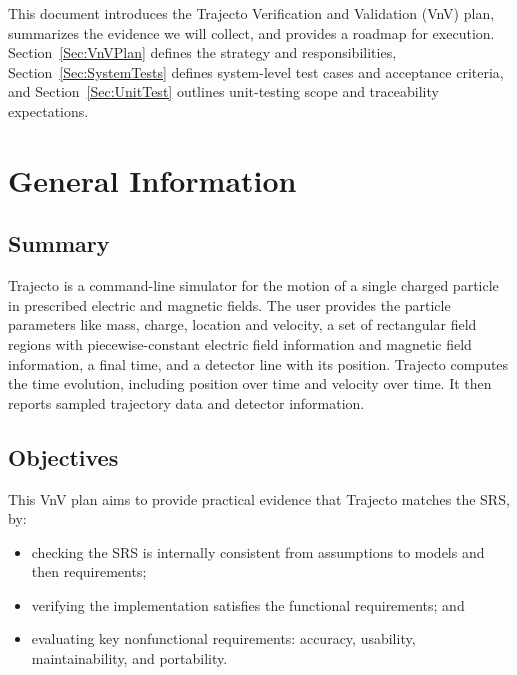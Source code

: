 \documentclass[12pt, titlepage]{article}
\providecommand{\wss}[1]{}
\providecommand{\progname}[1]{#1}
\begin{document}
\wss{symbols, abbreviations, or acronyms --- you can simply reference the SRS
  \citep{SRS} tables, if appropriate}

\wss{Remove this section if it isn't needed}

\newpage


This document introduces the Trajecto Verification and Validation (VnV) plan,
summarizes the evidence we will collect, and provides a roadmap for execution.
Section~\ref{Sec:VnVPlan} defines the strategy and responsibilities,
Section~\ref{Sec:SystemTests} defines system-level test cases and acceptance
criteria, and Section~\ref{Sec:UnitTest} outlines unit-testing scope and
traceability expectations.

\section{General Information}

\subsection{Summary}

Trajecto is a command-line simulator for the motion of a single charged particle
in prescribed electric and magnetic fields. The user provides the particle
parameters like mass, charge, location and velocity, a set of rectangular field
regions with piecewise-constant electric field information and magnetic field
information, a final time, and a detector line with its position. Trajecto
computes the time evolution, including position over time and velocity over
time. It then reports sampled trajectory data and detector information.

\subsection{Objectives}

This VnV plan aims to provide practical evidence that \progname{Trajecto} matches
the SRS, by:
\begin{itemize}
  \item checking the SRS is internally consistent from assumptions to models and
  then requirements;
  \item verifying the implementation satisfies the functional requirements; and
  \item evaluating key nonfunctional requirements: accuracy, usability,
  maintainability, and portability.
\end{itemize}
\end{document}
